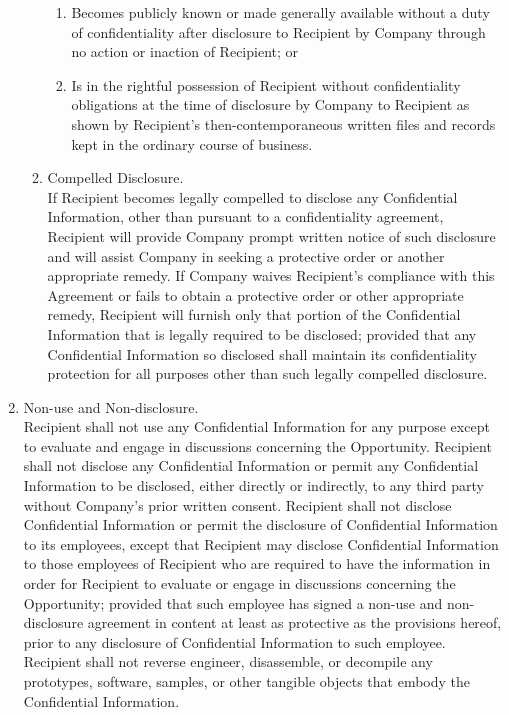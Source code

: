 \documentclass[letterpaper, 12pt]{article}
\begin{document}
\begin{enumerate}
\begin{enumerate}
\begin{enumerate}
            \item Becomes publicly known or made generally available without a duty of confidentiality after disclosure to Recipient by Company through no action or inaction of Recipient; or
            \item Is in the rightful possession of Recipient without confidentiality obligations at
the time of disclosure by Company to Recipient as shown by Recipient’s then-contemporaneous written files and records kept in the ordinary course of business.
        \end{enumerate} 
        \item Compelled Disclosure. \\
        If Recipient becomes legally compelled to disclose any Confidential Information, other than pursuant to a confidentiality agreement, Recipient will provide Company prompt written notice of such disclosure and will assist Company in seeking a protective order or another appropriate remedy. If Company waives Recipient’s compliance with this Agreement or fails to obtain a protective order or other appropriate remedy, Recipient will furnish only that portion of the Confidential Information that is legally required to be disclosed; provided that any Confidential Information so disclosed shall maintain its confidentiality protection for all purposes other than such legally compelled disclosure.
    \end{enumerate}
    \item Non-use and Non-disclosure.\\
    Recipient shall not use any Confidential Information for any purpose except to evaluate and engage in discussions concerning the Opportunity. Recipient shall not disclose any Confidential Information or permit any Confidential Information to be disclosed, either directly or indirectly, to any third party without Company’s prior written consent. Recipient shall not disclose Confidential Information or permit the disclosure of Confidential Information to its employees, except that Recipient may disclose Confidential Information to those employees of Recipient who are required to have the information in order for Recipient to evaluate or engage in discussions concerning the Opportunity; provided that such employee has signed a non-use and non-disclosure agreement in content at least as protective as the provisions hereof, prior to any disclosure of Confidential Information to such employee. Recipient shall not reverse engineer, disassemble, or decompile any prototypes, software, samples, or other tangible objects that embody the Confidential Information.

\end{enumerate}
\end{document}
